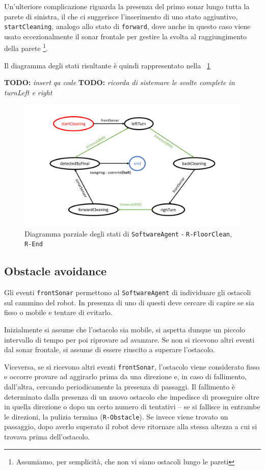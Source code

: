 \documentclass{../llncs}
\newcommand{\codescript}[1]{{\mbox{\small{\texttt{#1}}}}\xspace}
\newcommand{\code}[1]{{\color{blue}\small{\texttt{#1}}}}
\newcommand{\labelfig}[1]{\label{fig:#1}}
\newcommand{\xf}[1]{\figurename~\ref{fig:#1}}
\newcommand{\todo}[1]{\textbf{TODO:} \emph{#1}}
\begin{document}
Un'ulteriore complicazione riguarda la presenza del primo sonar lungo tutta la parete di sinistra, il che ci suggerisce l'inserimento di uno stato aggiuntivo, \texttt{startCleaning}, analogo allo stato di \texttt{forward}, dove anche in questo caso viene usato eccezionalmente il sonar frontale per gestire la svolta al raggiungimento della parete
\footnote{Assumiamo, per semplicità, che non vi siano ostacoli lungo le pareti}.

Il diagramma degli stati risultante è quindi rappresentato nella \xf{floorClean}

\todo{insert qa code}
\todo{ricorda di sistemare le svolte complete in turnLeft e right}

\begin{figure}[!htb]
\centering
\includegraphics[scale=0.4]{img/stateDiagramCleaning.png}
\caption{Diagramma parziale degli stati di \texttt{SoftwareAgent} - \code{R-FloorClean}, \code{R-End}}\labelfig{floorClean}
\end{figure}

\subsection{Obstacle avoidance}
Gli eventi \codescript{frontSonar} permettono al  \texttt{SoftwareAgent} di individuare gli ostacoli sul cammino del robot. In presenza di uno di questi deve cercare di capire se sia fisso o mobile e tentare di evitarlo.

Inizialmente si assume che l'ostacolo sia mobile, si aspetta dunque un piccolo intervallo di tempo per poi riprovare ad avanzare. Se non si ricevono altri eventi dal sonar frontale, si assume di essere riuscito a superare l'ostacolo.

Viceversa, se si ricevono altri eventi \codescript{frontSonar}, l'ostacolo viene considerato fisso e occorre provare ad aggirarlo prima da una direzione e, in caso di fallimento, dall'altra, cercando periodicamente la presenza di passaggi. Il fallimento è determinato dalla presenza di un nuovo ostacolo che impedisce di proseguire oltre in quella direzione o dopo un certo numero di tentativi -- se si fallisce in entrambe le direzioni, la pulizia termina (\code{R-Obstacle}). Se invece viene trovato un passaggio, dopo averlo superato il robot deve ritornare alla stessa altezza a cui si trovava prima dell'ostacolo.
\end{document}
